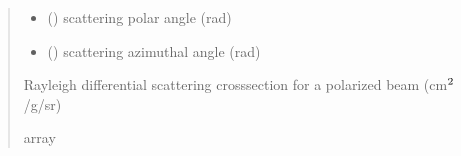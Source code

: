 \documentclass[letterpaper,10pt,english,openany,oneside]{sphinxmanual}
\begin{document}
\begin{fulllineitems}
\begin{quote}
\begin{description}
\begin{itemize}
\item {} 
\sphinxAtStartPar
{} () \textendash{} scattering polar angle (rad)

\item {} 
\sphinxAtStartPar
{} () \textendash{} scattering azimuthal angle (rad)

\end{itemize}

\sphinxAtStartPar
Rayleigh differential scattering cross\sphinxhyphen{}section for a polarized beam
(cm\(\sp{\text{2}}\)/g/sr)

\sphinxAtStartPar
array

\end{description}\end{quote}

\end{fulllineitems}


\begin{DUlineblock}{0em}
\item[] 
\end{DUlineblock}
\end{document}
